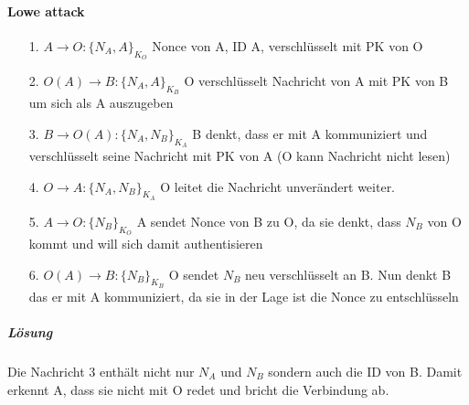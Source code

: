 \documentclass{scrartcl}
\begin{document}
\paragraph*{Lowe attack}
\begin{itemize}
\item[1.] $A \rightarrow O: \lbrace N_A, A \rbrace_{K_O}$
Nonce von A, ID A, verschlüsselt mit PK von O
\item[2.] $O(A) \rightarrow B: \lbrace N_A, A \rbrace_{K_B} $
O verschlüsselt Nachricht von A mit PK von B um sich als A auszugeben
\item[3.] $B \rightarrow O(A): \lbrace N_A, N_B \rbrace_{K_A}$
B denkt, dass er mit A kommuniziert und verschlüsselt seine Nachricht mit PK von A
(O kann Nachricht nicht lesen)
\item[4.] $O \rightarrow A: \lbrace N_A, N_B \rbrace_{K_A}$
O leitet die Nachricht unverändert weiter.
\item[5.] $ A \rightarrow O: \lbrace N_B \rbrace_{K_O}$
A sendet Nonce von B zu O, da sie denkt, dass $N_B$ von O kommt und will sich damit authentisieren
\item[6.] $ O(A) \rightarrow B: \lbrace N_B \rbrace_{K_B}$
O sendet $N_B$ neu verschlüsselt an B. Nun denkt B das er mit A kommuniziert, da sie in der Lage ist die Nonce zu entschlüsseln
\end{itemize}

\subparagraph*{Lösung}
Die Nachricht 3 enthält nicht nur $N_A$ und $N_B$ sondern auch die ID von B.
Damit erkennt A, dass sie nicht mit O redet und bricht die Verbindung ab.
\end{document}

